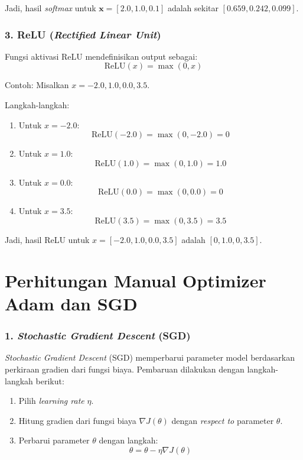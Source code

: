 Jadi, hasil \textit{softmax} untuk \(\mathbf{x} = [2.0, 1.0, 0.1]\) adalah sekitar \([0.659, 0.242, 0.099]\).

\subsection*{3. ReLU (\textit{Rectified Linear Unit})}
Fungsi aktivasi ReLU mendefinisikan output sebagai:
\[
\text{ReLU}(x) = \max(0, x)
\]

Contoh: Misalkan \( x = -2.0, 1.0, 0.0, 3.5 \).

Langkah-langkah:
\begin{enumerate}
    \item Untuk \( x = -2.0 \):
    \[
    \text{ReLU}(-2.0) = \max(0, -2.0) = 0
    \]

    \item Untuk \( x = 1.0 \):
    \[
    \text{ReLU}(1.0) = \max(0, 1.0) = 1.0
    \]

    \item Untuk \( x = 0.0 \):
    \[
    \text{ReLU}(0.0) = \max(0, 0.0) = 0
    \]

    \item Untuk \( x = 3.5 \):
    \[
    \text{ReLU}(3.5) = \max(0, 3.5) = 3.5
    \]
\end{enumerate}

Jadi, hasil ReLU untuk \( x = [-2.0, 1.0, 0.0, 3.5] \) adalah \([0, 1.0, 0, 3.5]\).



\chapter{Perhitungan Manual Optimizer Adam dan SGD}

\subsection*{1. \textit{Stochastic Gradient Descent} (SGD)}

\textit{Stochastic Gradient Descent} (SGD) memperbarui parameter model berdasarkan perkiraan gradien dari fungsi biaya. Pembaruan dilakukan dengan langkah-langkah berikut:

\begin{enumerate}
    \item Pilih \textit{learning rate} \(\eta\).
    \item Hitung gradien dari fungsi biaya \(\nabla J(\theta)\) dengan \textit{respect to} parameter \(\theta\).
    \item Perbarui parameter \(\theta\) dengan langkah:
    \[
    \theta = \theta - \eta \nabla J(\theta)
    \]
\end{enumerate}

